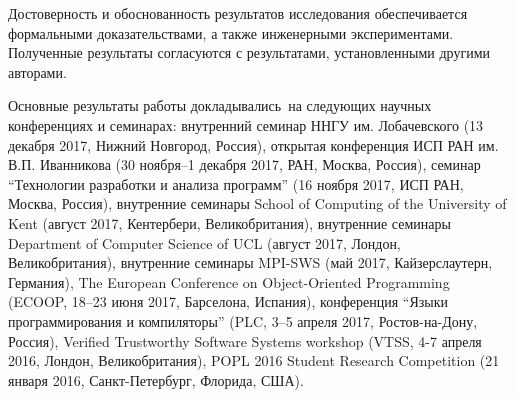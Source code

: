 
    
    

{\reliability}
Достоверность и обоснованность результатов исследования
обеспечивается формальными доказательствами, а также инженерными экспериментами.
Полученные результаты согласуются с результатами, установленными другими авторами.

Основные результаты работы докладывались~на следующих научных конференциях и семинарах:
внутренний семинар ННГУ им. Лобачевского (13 декабря 2017, Нижний Новгород, Россия),
открытая конференция ИСП РАН им. В.П. Иванникова (30 ноября--1 декабря  2017, РАН, Москва, Россия),
семинар ``Технологии разработки и анализа программ'' (16 ноября 2017, ИСП РАН, Москва, Россия),
внутренние семинары School of Computing of the University of Kent (август 2017, Кентербери, Великобритания),
внутренние семинары Department of Computer Science of UCL (август 2017, Лондон, Великобритания),
внутренние семинары MPI-SWS (май 2017, Кайзерслаутерн, Германия),
The European Conference on Object-Oriented Programming (ECOOP, 18--23 июня 2017, Барселона, Испания),
конференция ``Языки программирования и компиляторы'' (PLC, 3--5 апреля 2017, Ростов-на-Дону, Россия),
Verified Trustworthy Software Systems workshop (VTSS, 4-7 апреля 2016, Лондон, Великобритания),
POPL 2016 Student Research Competition (21 января 2016, Санкт-Петербург, Флорида, США).


